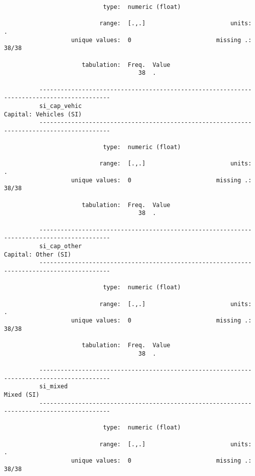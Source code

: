 \documentclass{article}
\begin{document}
\begin{verbatim}
                            type:  numeric (float)
          
                           range:  [.,.]                        units:  .
                   unique values:  0                        missing .:  38/38
          
                      tabulation:  Freq.  Value
                                      38  .
          
          ------------------------------------------------------------------------------------------
          si_cap_vehic                                                        Capital: Vehicles (SI)
          ------------------------------------------------------------------------------------------
          
                            type:  numeric (float)
          
                           range:  [.,.]                        units:  .
                   unique values:  0                        missing .:  38/38
          
                      tabulation:  Freq.  Value
                                      38  .
          
          ------------------------------------------------------------------------------------------
          si_cap_other                                                           Capital: Other (SI)
          ------------------------------------------------------------------------------------------
          
                            type:  numeric (float)
          
                           range:  [.,.]                        units:  .
                   unique values:  0                        missing .:  38/38
          
                      tabulation:  Freq.  Value
                                      38  .
          
          ------------------------------------------------------------------------------------------
          si_mixed                                                                        Mixed (SI)
          ------------------------------------------------------------------------------------------
          
                            type:  numeric (float)
          
                           range:  [.,.]                        units:  .
                   unique values:  0                        missing .:  38/38
          

\end{verbatim}
\end{document}
